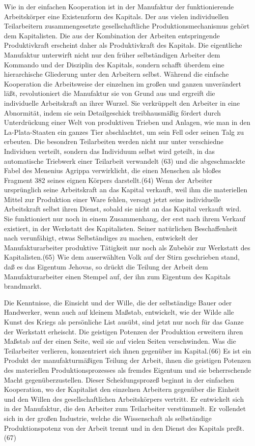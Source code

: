 {Wie in der einfachen Kooperation ist in der Manufaktur der
funktionierende Arbeitskörper eine Existenzform des Kapitals. Der aus
vielen individuellen Teilarbeitern zusammengesetzte gesellschaftliche
Produktionsmechanismus gehört dem Kapitalisten. Die aus der Kombination
der Arbeiten entspringende Produktivkraft erscheint daher als
Produktivkraft des Kapitals. Die eigentliche Manufaktur unterwirft nicht
nur den früher selbständigen Arbeiter dem Kommando und der Disziplin des
Kapitals, sondern schafft überdem eine hierarchische Gliederung unter
den Arbeitern selbst. Während die einfache Kooperation die Arbeitsweise
der einzelnen im großen und ganzen unverändert läßt, revolutioniert die
Manufaktur sie von Grund aus und ergreift die individuelle Arbeitskraft
an ihrer Wurzel. Sie verkrüppelt den Arbeiter in eine Abnormität, indem
sie sein Detailgeschick treibhausmäßig fördert durch Unterdrückung einer
Welt von produktiven Trieben und Anlagen, wie man in den
La-Plata-Staaten ein ganzes Tier abschlachtet, um sein Fell oder seinen
Talg zu erbeuten. Die besondren Teilarbeiten werden nicht nur unter
verschiedne Individuen verteilt, sondern das Individuum selbst wird
geteilt, in das automatische Triebwerk einer Teilarbeit verwandelt (63)
und die abgeschmackte Fabel des Menenius Agrippa verwirklicht, die einen
Menschen als bloßes Fragment \num{382} seines eignen
Körpers darstellt.(64) Wenn der Arbeiter ursprünglich seine Arbeitskraft
an das Kapital verkauft, weil ihm die materiellen Mittel zur Produktion
einer Ware fehlen, versagt jetzt seine individuelle Arbeitskraft selbst
ihren Dienst, sobald sie nicht an das Kapital verkauft wird. Sie
funktioniert nur noch in einem Zusammenhang, der erst nach ihrem Verkauf
existiert, in der Werkstatt des Kapitalisten. Seiner natürlichen
Beschaffenheit nach verunfähigt, etwas Selbständiges zu machen,
entwickelt der Manufakturarbeiter produktive Tätigkeit nur noch als
Zubehör zur Werkstatt des Kapitalisten.(65) Wie dem auserwählten Volk
auf der Stirn geschrieben stand, daß es das Eigentum Jehovas, so drückt
die Teilung der Arbeit dem Manufakturarbeiter einen Stempel auf, der ihn
zum Eigentum des Kapitals brandmarkt.

Die Kenntnisse, die Einsicht und der Wille, die der selbständige Bauer
oder Handwerker, wenn auch auf kleinem Maßstab, entwickelt, wie der
Wilde alle Kunst des Kriegs als persönliche List ausübt, sind jetzt nur
noch für das Ganze der Werkstatt erheischt. Die geistigen Potenzen der
Produktion erweitern ihren Maßstab auf der einen Seite, weil sie auf
vielen Seiten verschwinden. Was die Teilarbeiter verlieren, konzentriert
sich ihnen gegenüber im Kapital.(66) Es ist ein Produkt der
manufakturmäßigen Teilung der Arbeit, ihnen die geistigen Potenzen des
materiellen Produktionsprozesses als fremdes Eigentum und sie
beherrschende Macht gegenüberzustellen. Dieser Scheidungsprozeß beginnt
in der einfachen Kooperation, wo der Kapitalist den einzelnen Arbeitern
gegenüber die Einheit und den Willen des gesellschaftlichen
Arbeitskörpers vertritt. Er entwickelt sich in der Manufaktur, die den
Arbeiter zum Teilarbeiter verstümmelt. Er vollendet sich in der großen
Industrie, welche die Wissenschaft als selbständige Produktionspotenz
von der Arbeit trennt und in den Dienst des Kapitals preßt.(67)

}
